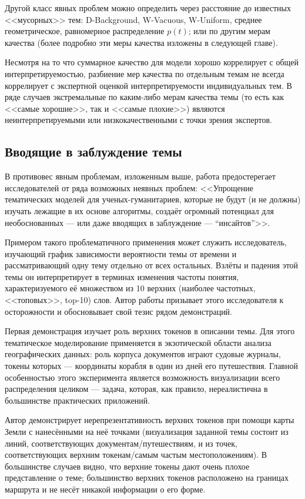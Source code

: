 Другой класс явных проблем можно определить через расстояние до известных <<мусорных>> тем: D-Background, W-Vacuous, W-Uniform, среднее геометрическое, равномерное распределение $p(t)$; или по другим мерам качества (более подробно эти меры качества изложены в следующей главе).

Несмотря на то что суммарное качество для модели хорошо коррелирует с общей интерпретируемостью, разбиение мер качества по отдельным темам не всегда коррелирует с экспертной оценкой интерпретируемости индивидуальных тем. В ряде случаев экстремальные по каким-либо мерам качества темы (то есть как <<самые хорошие>>, так и <<самые плохие>>) являются неинтерпретируемыми или низкокачественными с точки зрения экспертов.

\subsection{Вводящие в заблуждение темы}

В противовес явным проблемам, изложенным выше, работа \cite{dh_sea} предостерегает исследователей от ряда возможных неявных проблем: <<Упрощение тематических моделей для ученых-гуманитариев, которые не будут (и не должны) изучать лежащие в их основе алгоритмы, создаёт огромный потенциал для необоснованных --- или даже вводящих в заблуждение --- ``инсайтов''>>.

Примером такого проблематичного применения может служить исследователь, изучающий график зависимости вероятности темы от времени и рассматривающий одну тему отдельно от всех остальных. Взлёты и падения этой темы он интерпретирует в терминах изменения частоты понятия, характеризуемого её множеством из 10 верхних (наиболее частотных, <<топовых>>, top-10) слов. Автор работы призывает этого исследователя к осторожности и обосновывает свой тезис рядом демонстраций.

Первая демонстрация изучает роль верхних токенов  в описании темы. Для этого тематическое моделирование применяется в экзотической области анализа географических данных: роль корпуса документов играют судовые журналы, токены которых --- координаты корабля в один из дней его путешествия. Главной особенностью этого эксперимента является возможность визуализации всего распределения целиком --- задача, которая, как правило, нереалистична в большинстве практических приложений.

Автор демонстрирует нерепрезентативность верхних токенов при помощи карты Земли с нанесёнными на неё точками (визуализация заданной темы состоит из линий, соответствующих документам/путешествиям, и из точек, соответствующих верхним токенам/самым частым местоположениям). В большинстве случаев видно, что верхние токены дают очень плохое представление о теме; большинство верхних токенов расположено на границах маршрута и не несёт никакой информации о его форме.

